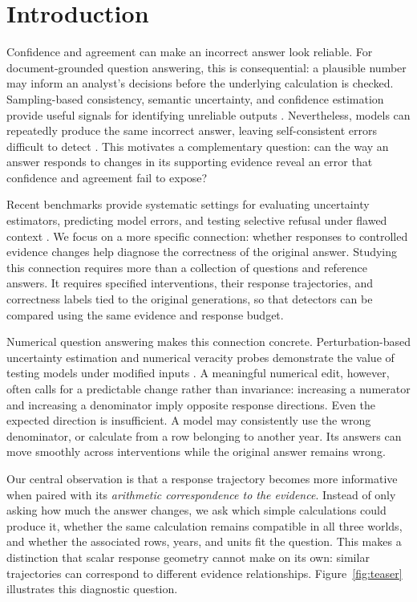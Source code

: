 \section{Introduction}
Confidence and agreement can make an incorrect answer look reliable. For document-grounded question answering, this is consequential: a plausible number may inform an analyst's decisions before the underlying calculation is checked. Sampling-based consistency, semantic uncertainty, and confidence estimation provide useful signals for identifying unreliable outputs \citep{manakul-etal-2023-selfcheckgpt,farquhar-etal-2024-semantic,geng-etal-2024-survey}. Nevertheless, models can repeatedly produce the same incorrect answer, leaving self-consistent errors difficult to detect \citep{tan-etal-2025-consistent}. This motivates a complementary question: can the way an answer responds to changes in its supporting evidence reveal an error that confidence and agreement fail to expose?

Recent benchmarks provide systematic settings for evaluating uncertainty estimators, predicting model errors, and testing selective refusal under flawed context \citep{vashurin-etal-2025-benchmarking,pacchiardi-etal-2025-predictaboard,muhamed-etal-2026-refusalbench}. We focus on a more specific connection: whether responses to controlled evidence changes help diagnose the correctness of the original answer. Studying this connection requires more than a collection of questions and reference answers. It requires specified interventions, their response trajectories, and correctness labels tied to the original generations, so that detectors can be compared using the same evidence and response budget.

Numerical question answering makes this connection concrete. Perturbation-based uncertainty estimation and numerical veracity probes demonstrate the value of testing models under modified inputs \citep{gao-etal-2024-spuq,aarnes-setty-2025-numpert}. A meaningful numerical edit, however, often calls for a predictable change rather than invariance: increasing a numerator and increasing a denominator imply opposite response directions. Even the expected direction is insufficient. A model may consistently use the wrong denominator, or calculate from a row belonging to another year. Its answers can move smoothly across interventions while the original answer remains wrong.

Our central observation is that a response trajectory becomes more informative when paired with its \emph{arithmetic correspondence to the evidence}. Instead of only asking how much the answer changes, we ask which simple calculations could produce it, whether the same calculation remains compatible in all three worlds, and whether the associated rows, years, and units fit the question. This makes a distinction that scalar response geometry cannot make on its own: similar trajectories can correspond to different evidence relationships. Figure~\ref{fig:teaser} illustrates this diagnostic question.

